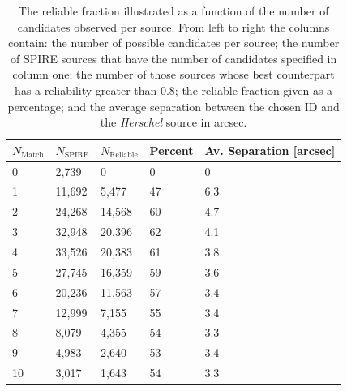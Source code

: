 \begin{table}
    \centering
    \begin{tabular}{p{2cm}|p{2cm}|p{2cm}|p{2cm}|p{4cm}}
        \hline
        \hline
        $N_{\textrm{Match}}$ & $N_{\textrm{SPIRE}}$ & $N_{\textrm{Reliable}}$ & Percent & Av. Separation [arcsec] \\
        \hline
        \hline
        0 & 2,739 & 0 & 0 & 0 \\
        1 & 11,692 & 5,477 & 47 & 6.3 \\
        2 & 24,268 & 14,568 & 60 & 4.7 \\
        3 & 32,948 & 20,396 & 62 & 4.1 \\
        4 & 33,526 & 20,383 & 61 & 3.8 \\
        5 & 27,745 & 16,359 & 59 & 3.6 \\
        6 & 20,236 & 11,563 & 57 & 3.4 \\
        7 & 12,999 & 7,155 & 55 & 3.4 \\
        8 & 8,079 & 4,355 & 54 & 3.3 \\
        9 & 4,983 & 2,640 & 53 & 3.4 \\
        10 & 3,017 & 1,643 & 54 & 3.3 \\
        \hline
    \end{tabular}
    \caption{The reliable fraction illustrated as a function of the number of candidates observed per source. From left to right the columns contain: the number of possible candidates per source; the number of SPIRE sources that have the number of candidates specified in column one; the number of those sources whose best counterpart has a reliability greater than 0.8; the reliable fraction given as a percentage; and the average separation between the chosen ID and the \textit{Herschel} source in arcsec.}
    \label{tab:multiplicity}
\end{table}

